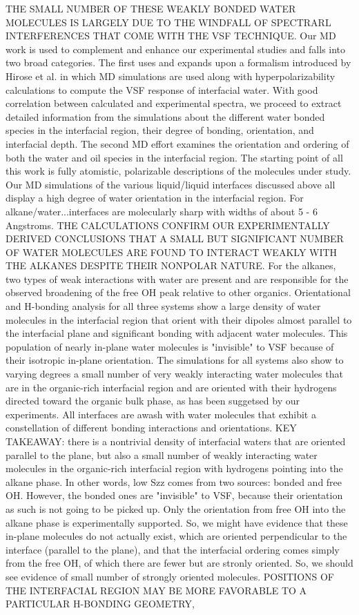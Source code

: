 \documentclass[12pt,reqno]{amsart}
\numberwithin{equation}{section}
\begin{document}
\begin{enumerate}
THE SMALL NUMBER OF THESE WEAKLY BONDED WATER MOLECULES IS LARGELY DUE TO THE WINDFALL OF SPECTRARL INTERFERENCES THAT COME WITH THE VSF TECHNIQUE.  Our MD work is used to complement and enhance our experimental studies and falls into two broad categories.  The first uses and expands upon a formalism introduced by Hirose et al. in which MD simulations are used along with hyperpolarizability calculations to compute the VSF response of interfacial water.  With good correlation between calculated and experimental spectra, we proceed to extract detailed information from the simulations about the different water bonded species in the interfacial region, their degree of bonding, orientation, and interfacial depth.  The second MD effort examines the orientation and ordering of both the water and oil species in the interfacial region.  The starting point of all this work is fully atomistic, polarizable descriptions of the molecules under study.  Our MD simulations of the various liquid/liquid interfaces discussed above all display a high degree of water orientation in the interfacial region.  For alkane/water...interfaces are molecularly sharp with widths of about 5 - 6 Angstroms.  THE CALCULATIONS CONFIRM OUR EXPERIMENTALLY DERIVED CONCLUSIONS THAT A SMALL BUT SIGNIFICANT NUMBER OF WATER MOLECULES ARE FOUND TO INTERACT WEAKLY WITH THE ALKANES DESPITE THEIR NONPOLAR NATURE.  For the alkanes, two types of weak interactions with water are present and are responsible for the observed broadening of the free OH peak relative to other organics.  Orientational and H-bonding analysis for all three systems show a large density of water molecules in the interfacial region that orient with their dipoles almost parallel to the interfacial plane and significant bonding with adjacent water molecules.  This population of nearly in-plane water molecules is "invisible" to VSF because of their isotropic in-plane orientation.  The simulations for all systems also show to varying degrees a small number of very weakly interacting water molecules that are in the organic-rich interfacial region and are oriented with their hydrogens directed toward the organic bulk phase, as has been suggetsed by our experiments.  All interfaces are awash with water molecules that exhibit a constellation of different bonding interactions and orientations.  KEY TAKEAWAY: there is a nontrivial density of interfacial waters that are oriented parallel to the plane, but also a small number of weakly interacting water molecules in the organic-rich interfacial region with hydrogens pointing into the alkane phase.  In other words, low Szz comes from two sources: bonded and free OH.  However, the bonded ones are "invisible" to VSF, because their orientation as such is not going to be picked up.  Only the orientation from free OH into the alkane phase is experimentally supported.  So, we might have evidence that these in-plane molecules do not actually exist, which are oriented perpendicular to the interface (parallel to the plane), and that the interfacial ordering comes simply from the free OH, of which there are fewer but are stronly oriented.  So, we should see evidence of small number of strongly oriented molecules.  POSITIONS OF THE INTERFACIAL REGION MAY BE MORE FAVORABLE TO A PARTICULAR H-BONDING GEOMETRY, 
\end{enumerate}
\end{document}
